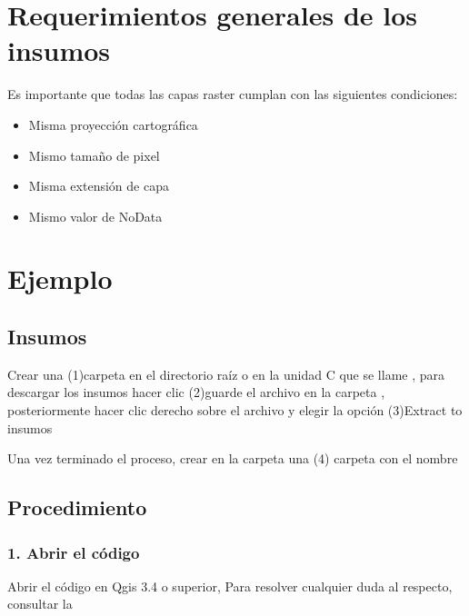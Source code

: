 \documentclass[letterpaper,10pt,spanish]{sphinxmanual}
\begin{document}
\section{Requerimientos generales de los insumos}
\label{\detokenize{analisis:requerimientos-generales-de-los-insumos}}
Es importante que todas las capas raster cumplan con las siguientes condiciones:
\begin{itemize}
\item {} 
Misma proyección cartográfica

\item {} 
Mismo tamaño de pixel

\item {} 
Misma extensión de capa

\item {} 
Mismo valor de NoData

\end{itemize}


\section{Ejemplo}
\label{\detokenize{analisis:ejemplo}}

\subsection{Insumos}
\label{\detokenize{analisis:insumos}}
Crear una (1)carpeta en el directorio raíz o en la unidad C que se llame ,
para descargar los insumos hacer clic  (2)guarde el archivo 
en la carpeta , posteriormente hacer clic derecho sobre el archivo  y elegir la opción (3)Extract to insumos

\noindent{}

Una vez terminado el proceso, crear en la carpeta  una (4) carpeta con el nombre 

\noindent{}


\subsection{Procedimiento}
\label{\detokenize{analisis:procedimiento}}

\subsubsection{1. Abrir el código}
\label{\detokenize{analisis:abrir-el-codigo}}
Abrir el código  en Qgis 3.4 o superior,
Para resolver cualquier duda al respecto, consultar la 
\end{document}
